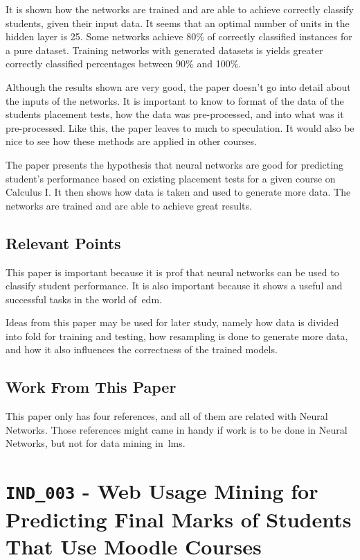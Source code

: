 It is shown how the networks are trained and are able to achieve correctly
classify students, given their input data. It seems that an optimal number of
units in the hidden layer is 25. Some networks achieve 80\% of correctly
classified instances for a pure dataset. Training networks with generated
datasets is yields greater correctly classified percentages between 90\% and
100\%.

Although the results shown are very good, the paper doesn't go into detail
about the inputs of the networks. It is important to know to format of the data
of the students placement tests, how the data was pre-processed, and into what
was it pre-processed. Like this, the paper leaves to much to speculation. It
would also be nice to see how these methods are applied in other courses.

The paper presents the hypothesis that neural networks are good for predicting
student's performance based on existing placement tests for a given course on
Calculus I. It then shows how data is taken and used to generate more data. The
networks are trained and are able to achieve great results.

\subsection{Relevant Points}

This paper is important because it is prof that neural networks can be used to
classify student performance. It is also important because it shows a useful
and successful tasks in the world of~\gls{edm}.

Ideas from this paper may be used for later study, namely how data is divided
into fold for training and testing, how resampling is done to generate more
data, and how it also influences the correctness of the trained models.

\subsection{Work From This Paper}

This paper only has four references, and all of them are related with Neural
Networks. Those references might came in handy if work is to be done in Neural
Networks, but not for data mining in~\gls{lms}.

\section{\texttt{IND\_003} - Web Usage Mining for Predicting Final Marks of
Students That Use Moodle Courses}

